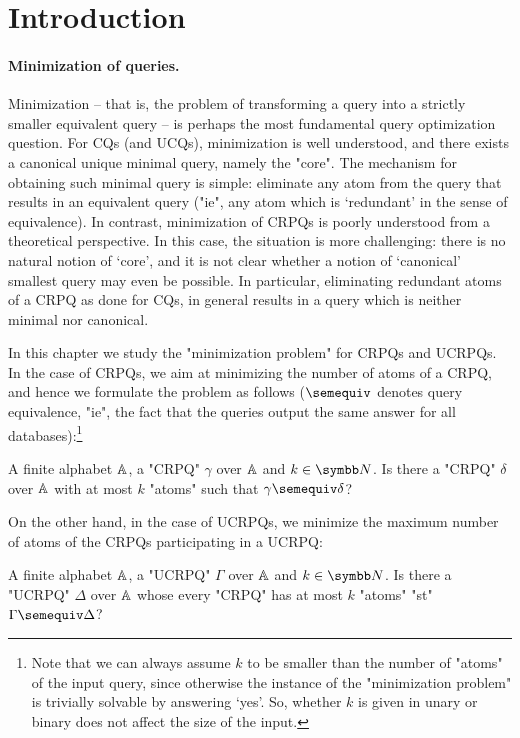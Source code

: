 \section{Introduction}
\AP\label{sec:intro}
	

\paragraph{Minimization of queries.}
Minimization -- that is, the problem of transforming a query into a strictly smaller equivalent 
query -- is perhaps the most fundamental query optimization question.
For CQs (and UCQs), minimization is well understood, and there exists a canonical unique minimal query, namely the "core".
The mechanism for obtaining such minimal query is simple: eliminate any atom from the query that results in an equivalent query ("ie", any atom which is `redundant'  in the sense of equivalence).
In contrast, minimization of CRPQs is poorly understood from a theoretical perspective. In this case, the situation is more challenging: there is no natural notion of `core’, and it is not clear whether a notion of `canonical’ smallest query may even be possible. In particular, eliminating redundant atoms of a CRPQ as done for CQs, in general results in a query which is neither minimal nor canonical.

In this chapter we study the "minimization problem" for CRPQs and UCRPQs. In the case of CRPQs, we aim at minimizing the number of atoms of a CRPQ, and hence we formulate the problem as follows ($\semequiv$ denotes query equivalence, "ie", the fact that the queries output the same answer for all databases):\footnote{Note that we can always assume $k$ to be smaller than the number of "atoms" of the input query, since otherwise the instance of the "minimization problem" is trivially solvable by answering `yes'. So, whether $k$ is given in unary or binary does not affect the size of the input.}

{A finite alphabet $\mathbb{A}$, a "CRPQ" $\gamma$ over $\mathbb{A}$ and $k \in \N$.}
{Is there a "CRPQ" $\delta$ over $\mathbb{A}$ with at most $k$ "atoms" 
such that $\gamma \semequiv \delta$?}
\medskip

On the other hand, in the case of UCRPQs, we minimize the maximum number of atoms of the CRPQs participating in a UCRPQ:
	
{A finite alphabet $\mathbb{A}$, a "UCRPQ" $\Gamma$ over $\mathbb{A}$ and $k \in \N$.}
{Is there a "UCRPQ" $\Delta$ over $\mathbb{A}$ whose every "CRPQ" has at most $k$ "atoms" 
"st" $\Gamma \semequiv \Delta$?}
\medskip

